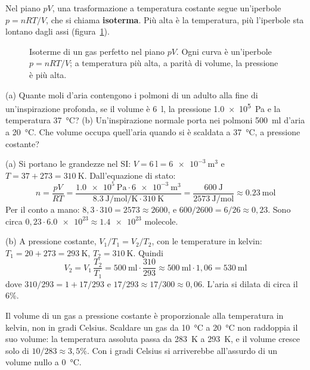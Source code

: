 Nel piano $pV$, una trasformazione a temperatura costante segue un'iperbole $p = nRT/V$, che si chiama \textbf{isoterma}. Più alta è la temperatura, più l'iperbole sta lontano dagli assi (figura~\ref{fig:ud5-isoterme}).

\begin{figure}[h]
\centering

\caption{Isoterme di un gas perfetto nel piano $pV$. Ogni curva è un'iperbole $p = nRT/V$; a temperatura più alta, a parità di volume, la pressione è più alta.}
\label{fig:ud5-isoterme}
\end{figure}

\begin{esempio}
(a) Quante moli d'aria contengono i polmoni di un adulto alla fine di un'inspirazione profonda, se il volume è \SI{6}{\litre}, la pressione \SI{1,0e5}{\pascal} e la temperatura \SI{37}{\celsius}? (b) Un'inspirazione normale porta nei polmoni \SI{500}{\milli\litre} d'aria a \SI{20}{\celsius}. Che volume occupa quell'aria quando si è scaldata a \SI{37}{\celsius}, a pressione costante?

(a) Si portano le grandezze nel SI: $V = \SI{6}{\litre} = \SI{6e-3}{\metre\cubed}$ e $T = 37 + 273 = \SI{310}{\kelvin}$. Dall'equazione di stato:
\[
  n = \frac{pV}{RT} = \frac{\SI{1,0e5}{\pascal} \cdot \SI{6e-3}{\metre\cubed}}{\SI{8,3}{\joule\per\mole\per\kelvin} \cdot \SI{310}{\kelvin}} = \frac{\SI{600}{\joule}}{\SI{2573}{\joule\per\mole}} \approx \SI{0,23}{\mole}
\]
Per il conto a mano: $8{,}3 \cdot 310 = 2573 \approx 2600$, e $600/2600 = 6/26 \approx 0{,}23$. Sono circa $0{,}23 \cdot \num{6,0e23} \approx \num{1,4e23}$ molecole.

(b) A pressione costante, $V_1/T_1 = V_2/T_2$, con le temperature in kelvin: $T_1 = 20 + 273 = \SI{293}{\kelvin}$, $T_2 = \SI{310}{\kelvin}$. Quindi
\[
  V_2 = V_1\,\frac{T_2}{T_1} = \SI{500}{\milli\litre} \cdot \frac{310}{293} \approx \SI{500}{\milli\litre} \cdot 1{,}06 = \SI{530}{\milli\litre}
\]
dove $310/293 = 1 + 17/293$ e $17/293 \approx 17/300 \approx 0{,}06$. L'aria si dilata di circa il 6\%.
\end{esempio}

\begin{attenzione}
Il volume di un gas a pressione costante è proporzionale alla temperatura in kelvin, non in gradi Celsius. Scaldare un gas da \SI{10}{\celsius} a \SI{20}{\celsius} non raddoppia il suo volume: la temperatura assoluta passa da \SI{283}{\kelvin} a \SI{293}{\kelvin}, e il volume cresce solo di $10/283 \approx 3{,}5\%$. Con i gradi Celsius si arriverebbe all'assurdo di un volume nullo a \SI{0}{\celsius}.
\end{attenzione}

